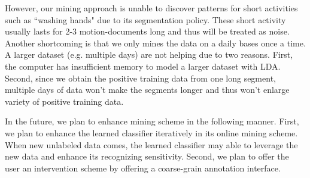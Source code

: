 \documentclass{sigchi}
\begin{document}
     However, our mining approach is unable to discover patterns for short activities such as ``washing hands" due to its segmentation policy.
     These short activity usually lasts for 2-3 motion-documents long and thus will be treated as noise.
     Another shortcoming is that we only mines the data on a daily bases once a time.
     A larger dataset (e.g. multiple days) are not helping due to two reasons.
     First, the computer has insufficient memory to model a larger dataset with LDA.
     Second, since we obtain the positive training data from one long segment, multiple days of data won't make the segments longer and thus won't enlarge variety of positive training data.

    In the future, we plan to enhance mining scheme in the following manner.
    First, we plan to enhance the learned classifier iteratively in its online mining scheme.
    When new unlabeled data comes, the learned classifier may able to leverage the new data and enhance its recognizing sensitivity.
    Second, we plan to offer the user an intervention scheme by offering a coarse-grain annotation interface.



%
%
%
%
%
\balance



\end{document}

